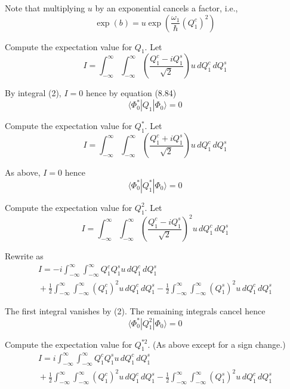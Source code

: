 \documentclass[12pt]{article}
\begin{document}
Note that multiplying $u$ by an exponential cancels a factor, i.e.,
\begin{equation*}
\exp(b)=u\exp\left(\frac{\omega_1}{\hbar}(Q_1^c)^2\right)
\end{equation*}

Compute the expectation value for $Q_1$.
Let
\begin{equation*}
I=\int_{-\infty}^\infty\int_{-\infty}^\infty
\left(\frac{Q_1^c-iQ_1^s}{\sqrt2}\right)
u\,dQ_1^c\,dQ_1^s
\end{equation*}

By integral (2), $I=0$ hence by equation (8.84)
\begin{equation*}
\langle\Phi_0^*|Q_1|\Phi_0\rangle=0
\end{equation*}

Compute the expectation value for $Q_1^*$.
Let
\begin{equation*}
I=\int_{-\infty}^\infty\int_{-\infty}^\infty
\left(\frac{Q_1^c+iQ_1^s}{\sqrt2}\right)
u\,dQ_1^c\,dQ_1^s
\end{equation*}

As above, $I=0$ hence
\begin{equation*}
\langle\Phi_0^*|Q_1^*|\Phi_0\rangle=0
\end{equation*}

Compute the expectation value for $Q_1^2$.
Let
\begin{equation*}
I=\int_{-\infty}^\infty\int_{-\infty}^\infty
\left(\frac{Q_1^c-iQ_1^s}{\sqrt2}\right)^2
u\,dQ_1^c\,dQ_1^s
\end{equation*}

Rewrite as
\begin{multline*}
I=-i\int_{-\infty}^\infty\int_{-\infty}^\infty
Q_1^cQ_1^s
u\,dQ_1^c\,dQ_1^s
\\
{}+\frac{1}{2}
\int_{-\infty}^\infty\int_{-\infty}^\infty
(Q_1^c)^2
u\,dQ_1^c\,dQ_1^s
-\frac{1}{2}
\int_{-\infty}^\infty\int_{-\infty}^\infty
(Q_1^s)^2
u\,dQ_1^c\,dQ_1^s
\end{multline*}

The first integral vanishes by (2).
The remaining integrals cancel hence
\begin{equation*}
\langle\Phi_0^*|Q_1^2|\Phi_0\rangle=0
\end{equation*}

Compute the expectation value for $Q_1^{*2}$.
(As above except for a sign change.)
\begin{multline*}
I=i\int_{-\infty}^\infty\int_{-\infty}^\infty
Q_1^cQ_1^s
u\,dQ_1^c\,dQ_1^s
\\
{}+\frac{1}{2}
\int_{-\infty}^\infty\int_{-\infty}^\infty
(Q_1^c)^2
u\,dQ_1^c\,dQ_1^s
-\frac{1}{2}
\int_{-\infty}^\infty\int_{-\infty}^\infty
(Q_1^s)^2
u\,dQ_1^c\,dQ_1^s
\end{multline*}
\end{document}
